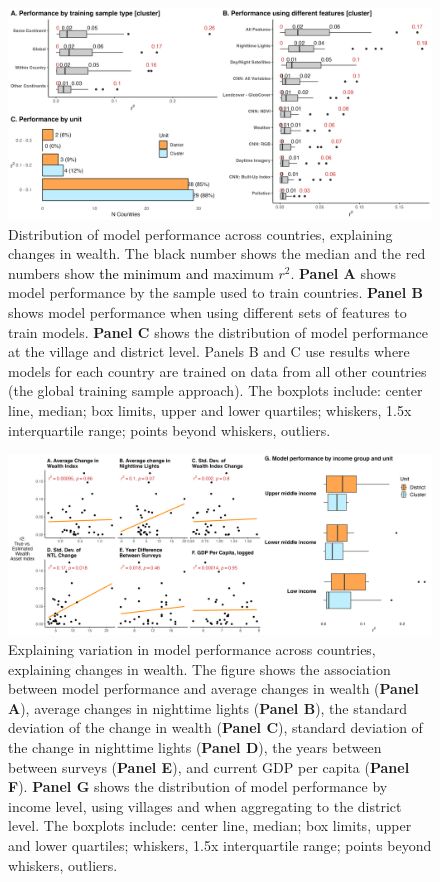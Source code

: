 \documentclass{article}
\begin{document}
\begin{figure}[H]
    \centering
    \includegraphics[width=1\textwidth]{figures/changes_results.png}
    \caption{Distribution of model performance across countries, explaining changes in wealth. The black number shows the median and the red numbers show \textcolor{black}{the minimum and} maximum $r^2$. {\bf Panel A} shows model performance by the sample used to train countries. {\bf Panel B} shows model performance when using different sets of features to train models. {\bf Panel C} shows the distribution of model performance at the village and district level. Panels B and C use results where models for each country are trained on data from all other countries (the global training sample approach). The boxplots include: center line, median; box limits, upper and lower quartiles; whiskers, 1.5x interquartile range; points beyond whiskers, outliers.}
     \label{fig:ml_changes_results}
\end{figure}

\begin{figure}[H]
    \centering
    \includegraphics[width=1\textwidth]{figures/ml_changes_explain.png}
    \caption{Explaining variation in model performance across countries, explaining changes in wealth. The figure shows the association between model performance and average changes in wealth ({\bf Panel A}), average changes in nighttime lights ({\bf Panel B}), the standard deviation of the change in wealth ({\bf Panel C}), standard deviation of the change in nighttime lights ({\bf Panel D}), the years between between surveys ({\bf Panel E}), and current GDP per capita ({\bf Panel F}). {\bf Panel G} shows the distribution of model performance by income level, using villages and when aggregating to the district level. The boxplots include: center line, median; box limits, upper and lower quartiles; whiskers, 1.5x interquartile range; points beyond whiskers, outliers.}
     \label{fig:ml_changes_explain}
\end{figure}
\end{document}
